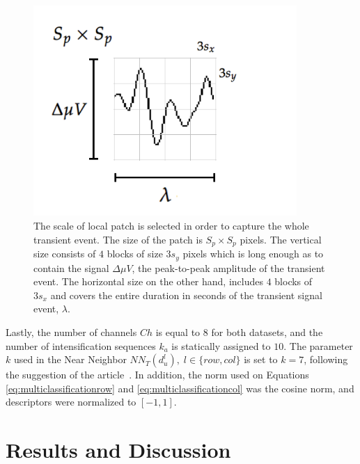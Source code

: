\documentclass[entropy,article,submit,moreauthors,pdftex,10pt,a4paper]{mdpi}
\begin{document}
\begin{figure}[H]
\centering
\includegraphics[width=10cm]{patchgeometry.pdf}
\caption{The scale of local patch is selected in order to capture the whole transient event.  The size of the patch is $S_p \times S_p$ pixels. The vertical size consists of $4$ blocks of size $3 s_y$ pixels which is long enough as to contain the signal $\Delta  \mu V $, the peak-to-peak amplitude of the transient event. The horizontal size on the other hand, includes $4$ blocks  of $3 s_x$ and covers the entire duration in seconds of the transient signal event, $ \lambda $.   }

\label{fig:sampledescriptor2}
\end{figure}

Lastly, the number of channels $Ch$ is equal to $8$ for both datasets, and the number of intensification sequences $k_a$ is statically assigned to $10$.  The parameter $k$ used in the Near Neighbor $NN_T(d^l_u), \;l\in\{row,{col}\}$ is set to $k=7$, following the suggestion of the article~\citep{Boiman2008}.  In addition, the norm used on  Equations \ref{eq:multiclassificationrow} and \ref{eq:multiclassificationcol} was the cosine norm, and descriptors were normalized to $ \left[ -1, 1 \right] $.

\section{Results and Discussion} \label{Results}
\label{section:results}
\end{document}
